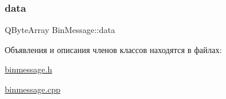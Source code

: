 \subsubsection{\texorpdfstring{data}{data}}
{\footnotesize\ttfamily Q\+Byte\+Array Bin\+Message\+::data}



Объявления и описания членов классов находятся в файлах\+:\begin{DoxyCompactItemize}
\item 
\hyperlink{binmessage_8h}{binmessage.\+h}\item 
\hyperlink{binmessage_8cpp}{binmessage.\+cpp}\end{DoxyCompactItemize}
